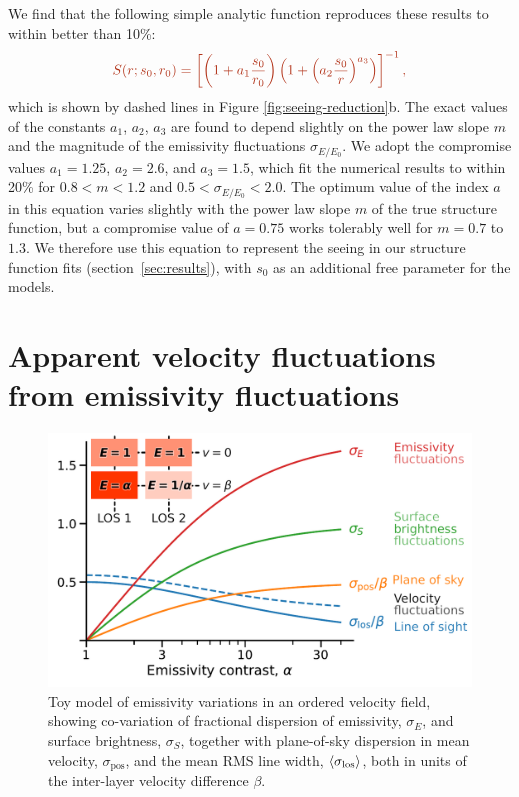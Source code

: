 \documentclass[fleqn,usenatbib, useAMS, a4paper]{mnras}
\newcommand\startNEW{\color{NEWcolor}}
\newcommand\stopNEW{\color{black}}
\newcommand\NEW[1]{\startNEW #1\stopNEW\relax}
\newcommand\pos{\ensuremath{_{\mathrm{pos}}}}
\newcommand\shortsig[1]{\ensuremath{\sigma_{#1/#1_0}}}
\begin{document}
We find that the following simple analytic function reproduces
these results to within better than 10\%:
\begin{equation}\label{eq:seeingemp2}
  \startNEW
  S(r; s_0, r_0) = 
  \left [
    \left (1+a_1\frac{s_0}{r_0} \right) 
    \left(1+ \left (a_2 \frac{ s_0}{r} \right) ^{a_3} \right)
  \right ]^{-1} ,
  \stopNEW
\end{equation}
which is shown by dashed lines in \NEW{Figure \ref{fig:seeing-reduction}b}.
\NEW{%
  The exact values of the constants \(a_1\), \(a_2\), \(a_3\)
  are found to depend slightly on the power law slope \(m\)
  and the magnitude of the emissivity fluctuations \(\shortsig{E}\).
  We adopt the compromise values \(a_1 = 1.25\),
  \(a_2 = 2.6\), and \(a_3 = 1.5\), which fit the numerical results to
  within 20\% for \(0.8 < m < 1.2\) and \(0.5 < \shortsig{E} < 2.0\).}
The optimum value of the index \(a\) in this equation varies slightly
with the power law slope \(m\) of the true structure function,
but a compromise value of \(a = 0.75\) works tolerably well for \(m = 0.7\) to \(1.3\).
We therefore use this equation to represent the seeing
in our structure function fits (section~\ref{sec:results}),
with \(s_0\) as an additional free parameter for the models.

\FloatBarrier

\section{Apparent velocity fluctuations from emissivity fluctuations}
\label{sec:appar-veloc-fluct}

\begin{figure}
  \centering
  \includegraphics[width=\linewidth]{Figures/bright-to-vel-fluct-annotated}
  \caption{
    Toy model of emissivity variations in an ordered velocity field,
    showing co-variation of fractional dispersion of
    emissivity, \(\sigma_E\), and surface brightness, \(\sigma_S\),
    together with plane-of-sky dispersion in mean velocity,
    \(\sigma\pos\),
    and the mean RMS line width, \(\langle\sigma_{\mathrm{los}}\rangle\),
    both in units of the inter-layer velocity difference \(\beta\).
  }
  \label{fig:bright-to-vel-fluct}
\end{figure}
\end{document}
